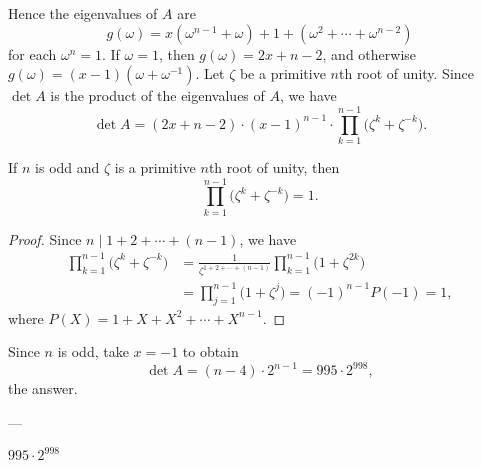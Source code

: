 Hence the eigenvalues of $A$ are \[g(\omega)=x(\omega^{n-1}+\omega)+1+(\omega^2+\cdots+\omega^{n-2})\]
for each $\omega^n=1$. If $\omega=1$, then $g(\omega)=2x+n-2$, and otherwise $g(\omega)=(x-1)(\omega+\omega^{-1})$. Let $\zeta$ be a primitive $n$th root of unity. Since $\det A$ is the product of the eigenvalues of $A$, we have \[\det A=(2x+n-2)\cdot(x-1)^{n-1}\cdot\prod_{k=1}^{n-1}\Big(\zeta^k+\zeta^{-k}\Big).\]
\begin{claim*}
    If $n$ is odd and $\zeta$ is a primitive $n$th root of unity, then \[\prod_{k=1}^{n-1}\Big(\zeta^k+\zeta^{-k}\Big)=1.\]
\end{claim*}
\begin{proof}
    Since $n\mid 1+2+\cdots+(n-1)$, we have
    \begin{align*}
        \prod_{k=1}^{n-1}\Big(\zeta^k+\zeta^{-k}\Big)&=\frac1{\zeta^{1+2+\cdots+(n-1)}}\prod_{k=1}^{n-1}\Big(1+\zeta^{2k}\Big)\\
        &=\prod_{j=1}^{n-1}\Big(1+\zeta^j\Big)
        =(-1)^{n-1}P(-1)=1,
    \end{align*}
    where $P(X)=1+X+X^2+\cdots+X^{n-1}$.
\end{proof}

Since $n$ is odd, take $x=-1$ to obtain \[\det A=(n-4)\cdot2^{n-1}=995\cdot2^{998},\]
the answer.

---

$995\cdot2^{998}$
